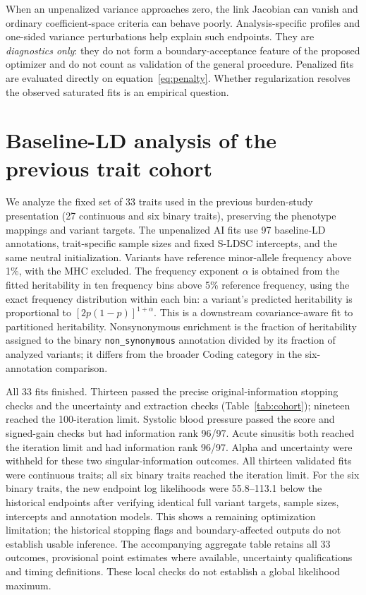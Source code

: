 \documentclass[11pt]{article}
\begin{document}
When an unpenalized variance approaches zero, the link Jacobian can vanish and ordinary coefficient-space criteria can behave poorly. Analysis-specific profiles and one-sided variance perturbations help explain such endpoints. They are \emph{diagnostics only}: they do not form a boundary-acceptance feature of the proposed optimizer and do not count as validation of the general procedure. Penalized fits are evaluated directly on equation~\eqref{eq:penalty}. Whether regularization resolves the observed saturated fits is an empirical question.

\section{Baseline-LD analysis of the previous trait cohort}
We analyze the fixed set of 33 traits used in the previous burden-study presentation (27 continuous and six binary traits), preserving the phenotype mappings and variant targets. The unpenalized AI fits use 97 baseline-LD annotations, trait-specific sample sizes and fixed S-LDSC intercepts, and the same neutral initialization. Variants have reference minor-allele frequency above 1\%, with the MHC excluded. The frequency exponent $\alpha$ is obtained from the fitted heritability in ten frequency bins above 5\% reference frequency, using the exact frequency distribution within each bin: a variant's predicted heritability is proportional to $[2p(1-p)]^{1+\alpha}$. This is a downstream covariance-aware fit to partitioned heritability. Nonsynonymous enrichment is the fraction of heritability assigned to the binary \texttt{non\_synonymous} annotation divided by its fraction of analyzed variants; it differs from the broader Coding category in the six-annotation comparison.

All 33 fits finished. Thirteen passed the precise original-information stopping checks and the uncertainty and extraction checks (Table~\ref{tab:cohort}); nineteen reached the 100-iteration limit. Systolic blood pressure passed the score and signed-gain checks but had information rank 96/97. Acute sinusitis both reached the iteration limit and had information rank 96/97. Alpha and uncertainty were withheld for these two singular-information outcomes. All thirteen validated fits were continuous traits; all six binary traits reached the iteration limit. For the six binary traits, the new endpoint log likelihoods were 55.8--113.1 below the historical endpoints after verifying identical full variant targets, sample sizes, intercepts and annotation models. This shows a remaining optimization limitation; the historical stopping flags and boundary-affected outputs do not establish usable inference. The accompanying aggregate table retains all 33 outcomes, provisional point estimates where available, uncertainty qualifications and timing definitions. These local checks do not establish a global likelihood maximum.
\end{document}
